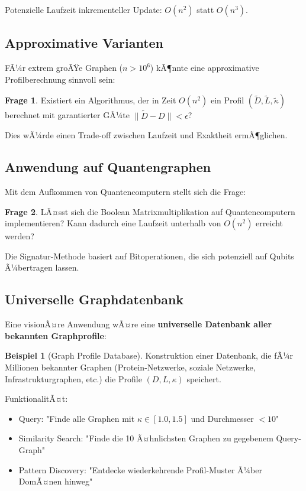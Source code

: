 ﻿\documentclass[a4paper,12pt]{article}
\theoremstyle{definition}
\newtheorem{beispiel}{Beispiel}
\newtheorem{frage}{Frage}
\begin{document}
	Potenzielle Laufzeit inkrementeller Update: $O(n^2)$ statt $O(n^3)$.
	
	\subsection{Approximative Varianten}
	
	FÃ¼r extrem groÃŸe Graphen ($n > 10^6$) kÃ¶nnte eine approximative Profilberechnung sinnvoll sein:
	
	\begin{frage}
		Existiert ein Algorithmus, der in Zeit $O(n^2)$ ein Profil $(\tilde{D}, \tilde{L}, \tilde{\kappa})$ berechnet mit garantierter GÃ¼te $\|\tilde{D} - D\| < \epsilon$?
	\end{frage}
	
	Dies wÃ¼rde einen Trade-off zwischen Laufzeit und Exaktheit ermÃ¶glichen.
	
	\subsection{Anwendung auf Quantengraphen}
	
	Mit dem Aufkommen von Quantencomputern stellt sich die Frage:
	
	\begin{frage}
		LÃ¤sst sich die Boolean Matrixmultiplikation auf Quantencomputern implementieren? Kann dadurch eine Laufzeit unterhalb von $O(n^2)$ erreicht werden?
	\end{frage}
	
	Die Signatur-Methode basiert auf Bitoperationen, die sich potenziell auf Qubits Ã¼bertragen lassen.
	
	\subsection{Universelle Graphdatenbank}
	
	Eine visionÃ¤re Anwendung wÃ¤re eine \textbf{universelle Datenbank aller bekannten Graphprofile}:
	
	\begin{beispiel}[Graph Profile Database]
		Konstruktion einer Datenbank, die fÃ¼r Millionen bekannter Graphen (Protein-Netzwerke, soziale Netzwerke, Infrastrukturgraphen, etc.) die Profile $(D, L, \kappa)$ speichert.
		
		FunktionalitÃ¤t:
		\begin{itemize}
			\item[-] Query: "Finde alle Graphen mit $\kappa \in [1.0, 1.5]$ und Durchmesser $< 10$"
			\item[-] Similarity Search: "Finde die 10 Ã¤hnlichsten Graphen zu gegebenem Query-Graph"
			\item[-] Pattern Discovery: "Entdecke wiederkehrende Profil-Muster Ã¼ber DomÃ¤nen hinweg"
		\end{itemize}
	\end{beispiel}
	
\end{document}
